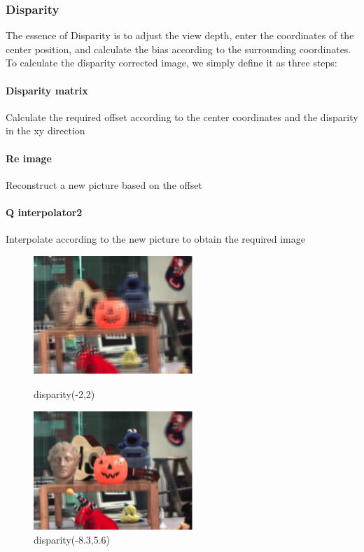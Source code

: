 \documentclass[letterpaper,12pt]{article}
\begin{document}
\subsubsection{Disparity}
The essence of Disparity is to adjust the view depth, enter the coordinates of the center position, and calculate the bias according to the surrounding coordinates.
\\
To calculate the disparity corrected image, we simply define it as three steps:
\paragraph{Disparity matrix}
Calculate the required offset according to the center coordinates and the disparity in the xy direction
\paragraph{Re image}Reconstruct a new picture based on the offset
\paragraph{Q interpolator2}Interpolate according to the new picture to obtain the required image
\begin{figure}[htbp]
	\centering
	\begin{minipage}[t]{0.48\textwidth}
		\centering
		\includegraphics[width=6cm]{Image/-2.png}
		\caption{disparity(-2,2)}
	\end{minipage}
	\begin{minipage}[t]{0.48\textwidth}
		\centering
		\includegraphics[width=6cm]{Image/dis.png}
		\caption{disparity(-8.3,5.6)}
	\end{minipage}
\end{figure}
\end{document}
